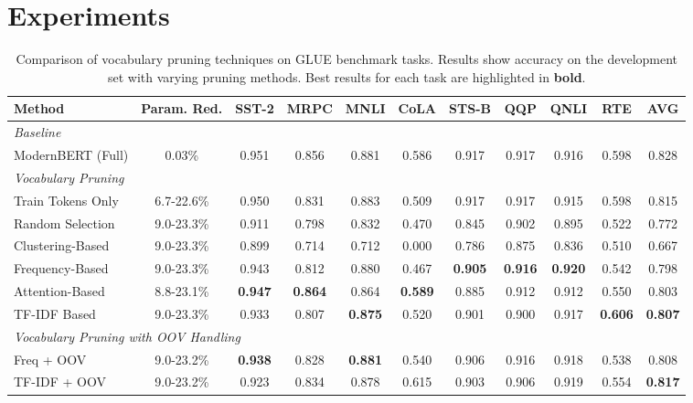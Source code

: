\documentclass[twocolumn]{article}
\begin{document}
\newpage
\section{Experiments}

\begin{table*}[ht!]
\centering
\small
\caption{Comparison of vocabulary pruning techniques on GLUE benchmark tasks. Results show accuracy on the development set with varying pruning methods. Best results for each task are highlighted in \textbf{bold}.}
\label{tab:results}
\setlength{\tabcolsep}{4pt}
\begin{tabular}{lccccccccc|c}
\toprule
\textbf{Method} & \textbf{Param. Red.} & \textbf{SST-2} & \textbf{MRPC} & \textbf{MNLI} & \textbf{CoLA} & \textbf{STS-B} & \textbf{QQP} & \textbf{QNLI} & \textbf{RTE} & \textbf{AVG} \\
\midrule
\multicolumn{11}{l}{\textit{Baseline}} \\
ModernBERT (Full) & 0.03\% & 0.951 & 0.856 & 0.881 & 0.586 & 0.917 & 0.917 & 0.916 & 0.598 & 0.828 \\
\midrule
\multicolumn{11}{l}{\textit{Vocabulary Pruning}} \\
Train Tokens Only & 6.7-22.6\% & 0.950 & 0.831 & 0.883 & 0.509 & 0.917 & 0.917 & 0.915 & 0.598 & 0.815 \\
\midrule
Random Selection & 9.0-23.3\% & 0.911 & 0.798 & 0.832 & 0.470 & 0.845 & 0.902 & 0.895 & 0.522 & 0.772 \\
Clustering-Based & 9.0-23.3\% & 0.899 & 0.714 & 0.712 & 0.000 & 0.786 & 0.875 & 0.836 & 0.510 & 0.667 \\
Frequency-Based & 9.0-23.3\% & 0.943 & 0.812 & 0.880 & 0.467 & \textbf{0.905} & \textbf{0.916} & \textbf{0.920} & 0.542 & 0.798 \\
Attention-Based & 8.8-23.1\% & \textbf{0.947} & \textbf{0.864} & 0.864 & \textbf{0.589} & 0.885 & 0.912 & 0.912 & 0.550 & 0.803 \\
TF-IDF Based & 9.0-23.3\% & 0.933 & 0.807 & \textbf{0.875} & 0.520 & 0.901 & 0.900 & 0.917 & \textbf{0.606} & \textbf{0.807} \\
\midrule
\multicolumn{11}{l}{\textit{Vocabulary Pruning with OOV Handling}} \\
Freq + OOV & 9.0-23.2\% & \textbf{0.938} & 0.828 & \textbf{0.881} & 0.540 & 0.906 & 0.916 & 0.918 & 0.538 & 0.808 \\
TF-IDF + OOV & 9.0-23.2\% & 0.923 & 0.834 & 0.878 & 0.615 & 0.903 & 0.906 & 0.919 & 0.554 & \textbf{0.817} \\
\bottomrule
\end{tabular}
\end{table*}
\end{document}
